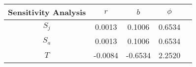 \small{
\begin{center}
\hspace{-.8cm}
\begin{tabular}{|c|c|c|c|c|}\hline
{Sensitivity Analysis}
& $r$ & $b$ & $\phi$\\
\hline
$S_j$ &  0.0013& 0.1006 & 0.6534\\
\hline
$S_a$ & 0.0013 & 0.1006 & 0.6534\\
\hline
$T$ & -0.0084 & -0.6534 & 2.2520\\
\hline
\end{tabular}
\end{center}
}